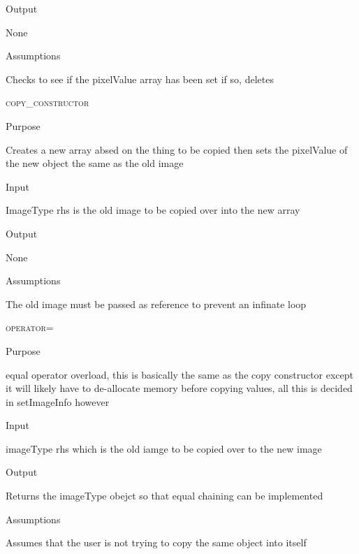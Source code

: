 \documentclass[pdftex, 11pt]{article}
\begin{document}
\begin{description}
\begin{description}
			\item{Output}

				None

			\item{Assumptions}

				Checks to see if the pixelValue array has been set
				if so, deletes

		\end{description}


	\item{\textsc{copy\_constructor}}
		\begin{description}
			\item{Purpose}
		
				Creates a new array absed on the thing to be copied
				then sets the pixelValue of the new object the same as
				the old image

			\item{Input}

				ImageType rhs is the old image to be copied over into
				the new array


			\item{Output}

				None

			\item{Assumptions}

				The old image must be passed as reference to prevent
				an infinate loop


		\end{description}


	\item{\textsc{operator=}}
		\begin{description}
			\item{Purpose}

				equal operator overload, this is basically
				the same as the copy constructor
				except it will likely have to 
				de-allocate memory before copying values, all
				this is decided in setImageInfo however

			\item{Input}

				imageType rhs which is the old iamge to be 
				copied over to the new image

			\item{Output}

				Returns the imageType obejct so that
				equal chaining can be implemented


			\item{Assumptions}

				Assumes that the user is not trying to copy the same
				object into itself



\end{description}
\end{description}
\end{document}

